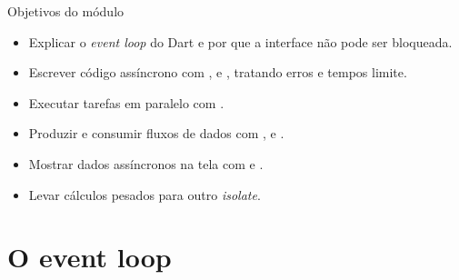 \documentclass[aspectratio=169,10pt]{beamer}
\begin{document}
\capa

\begin{frame}{Objetivos do módulo}
  \begin{conceito}
    \begin{itemize}
      \item Explicar o \emph{event loop} do Dart e por que a interface não pode ser bloqueada.
      \item Escrever código assíncrono com ,  e , tratando erros e tempos limite.
      \item Executar tarefas em paralelo com .
      \item Produzir e consumir fluxos de dados com ,  e .
      \item Mostrar dados assíncronos na tela com  e .
      \item Levar cálculos pesados para outro \emph{isolate}.
    \end{itemize}
  \end{conceito}
\end{frame}

\sumario



\section{O event loop}
\end{document}
